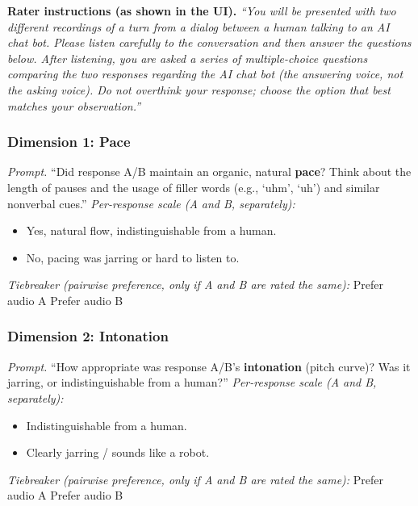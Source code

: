 \begin{tcolorbox}[gray_box, title = {{Aesthetic Naturalness Human Evaluation Rubric }}]\footnotesize
\textbf{Rater instructions (as shown in the UI).}
\emph{``You will be presented with two different recordings of a turn
from a dialog between a human talking to an AI chat bot. Please listen
carefully to the conversation and then answer the questions below.
After listening, you are asked a series of multiple-choice questions
comparing the two responses regarding the AI chat bot (the answering
voice, not the asking voice). Do not overthink your response; choose
the option that best matches your observation.''}
\subsubsection*{Dimension 1: Pace}
\emph{Prompt.} ``Did response A/B maintain an organic, natural
\textbf{pace}? Think about the length of pauses and the usage of filler
words (e.g., `uhm', `uh') and similar nonverbal cues.''
\noindent\emph{Per-response scale (A and B, separately):}
\begin{itemize}[leftmargin=1.2em, nosep]
  \item[1] Yes, natural flow, indistinguishable from a human.
  \item[0] No, pacing was jarring or hard to listen to.
\end{itemize}
\noindent\emph{Tiebreaker (pairwise preference, only if A and B are rated the same):}  Prefer audio A  Prefer audio B
\subsubsection*{Dimension 2: Intonation}
\emph{Prompt.} ``How appropriate was response A/B's \textbf{intonation}
(pitch curve)? Was it jarring, or indistinguishable from a human?''
\noindent\emph{Per-response scale (A and B, separately):}
\begin{itemize}[leftmargin=1.2em, nosep]
  \item[1] Indistinguishable from a human.
  \item[0] Clearly jarring / sounds like a robot.
\end{itemize}
\noindent\emph{Tiebreaker (pairwise preference, only if A and B are rated the same):}  Prefer audio A  Prefer audio B

\end{tcolorbox}
